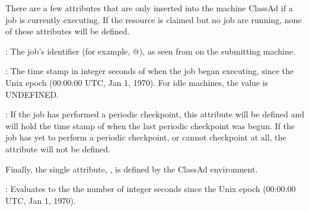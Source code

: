 There are a few attributes that are only inserted into the
machine ClassAd if a job is currently executing.  
If the resource is claimed but no job are running, none of these
attributes will be defined.

\begin{description}

\item[\AdAttr{JobId}] : The job's identifier (for example,
@), as seen from 
on the submitting machine.

\item[\AdAttr{JobStart}] : The time stamp in integer seconds of when the job began
executing, since the Unix epoch (00:00:00 UTC, Jan 1, 1970).  For idle
machines, the value is UNDEFINED.

\item[\AdAttr{LastPeriodicCheckpoint}] : If the job has performed a
periodic checkpoint, this attribute will be defined and will hold the
time stamp of when the last periodic checkpoint was begun.
If the job has yet to perform a periodic checkpoint, or cannot
checkpoint at all, the  attribute will
not be defined.

\end{description}

Finally, the single attribute, 
, is defined by the ClassAd
environment.
\begin{description}
\item[\AdAttr{CurrentTime}] : Evaluates to the 
the number of integer seconds since the Unix epoch (00:00:00 UTC, Jan 1, 1970).
\end{description}
